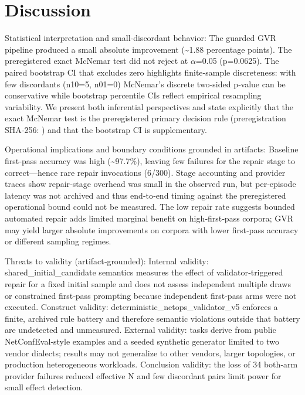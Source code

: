 \documentclass[conference]{IEEEtran}
\begin{document}
\section{Discussion}
Statistical interpretation and small‑discordant behavior: The guarded GVR pipeline produced a small absolute improvement (\textasciitilde{}1.88 percentage points). The preregistered exact McNemar test did not reject at \ensuremath{\alpha}=0.05 (p=0.0625). The paired bootstrap CI that excludes zero highlights finite‑sample discreteness: with few discordants (n10=5, n01=0) McNemar's discrete two‑sided p‑value can be conservative while bootstrap percentile CIs reflect empirical resampling variability. We present both inferential perspectives and state explicitly that the exact McNemar test is the preregistered primary decision rule (preregistration SHA‑256: ) and that the bootstrap CI is supplementary.

Operational implications and boundary conditions grounded in artifacts: Baseline first‑pass accuracy was high (\textasciitilde{}97.7\%), leaving few failures for the repair stage to correct---hence rare repair invocations (6/300). Stage accounting and provider traces show repair‑stage overhead was small in the observed run, but per‑episode latency was not archived and thus end‑to‑end timing against the preregistered operational bound could not be measured. The low repair rate suggests bounded automated repair adds limited marginal benefit on high‑first‑pass corpora; GVR may yield larger absolute improvements on corpora with lower first‑pass accuracy or different sampling regimes.

Threats to validity (artifact‑grounded): Internal validity: shared\_initial\_candidate semantics measures the effect of validator‑triggered repair for a fixed initial sample and does not assess independent multiple draws or constrained first‑pass prompting because independent first‑pass arms were not executed. Construct validity: deterministic\_netops\_validator\_v5 enforces a finite, archived rule battery and therefore semantic violations outside that battery are undetected and unmeasured. External validity: tasks derive from public NetConfEval‑style examples and a seeded synthetic generator limited to two vendor dialects; results may not generalize to other vendors, larger topologies, or production heterogeneous workloads. Conclusion validity: the loss of 34 both‑arm provider failures reduced effective N and few discordant pairs limit power for small effect detection.
\end{document}
